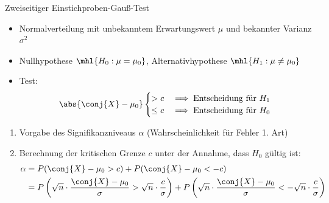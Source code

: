 \begin{algo}{Zweiseitiger Einstichproben-Gauß-Test}
    \begin{itemize}
        \item Normalverteilung mit unbekanntem Erwartungswert $\mu$ und bekannter Varianz $\sigma^2$
        \item Nullhypothese $\mhl{H_0: \mu = \mu_0}$, Alternativhypothese $\mhl{H_1: \mu \neq \mu_0}$
        \item Test:
              \[
                  \abs{\conj{X} - \mu_0}
                  \begin{cases}
                      > c    & \implies \text{Entscheidung für $H_1$} \\
                      \leq c & \implies \text{Entscheidung für $H_0$}
                  \end{cases}
              \]
    \end{itemize}

    \begin{enumerate}
        \item Vorgabe des Signifikanzniveaus $\alpha$ (Wahrscheinlichkeit für Fehler 1. Art)
        \item Berechnung der kritischen Grenze $c$ unter der Annahme, dass $H_0$ gültig ist:
              \begin{alignat*}{1}
                  \alpha & = P(\conj{X} - \mu_0 > c) + P(\conj{X} - \mu_0 < -c)                                                                                                                                                     \\
                         & = P \left( \sqrt{n} \cdot \frac{\conj{X} - \mu_0}{\sigma} > \sqrt{n} \cdot \frac{c}{\sigma} \right) + P \left( \sqrt{n} \cdot \frac{\conj{X} - \mu_0}{\sigma} < -\sqrt{n} \cdot \frac{c}{\sigma} \right)
              \end{alignat*}


\end{enumerate}
\end{algo}
